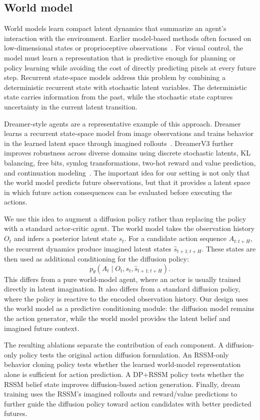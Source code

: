 \subsection{World model}

World models learn compact latent dynamics that summarize an agent's interaction with the environment. Earlier model-based methods often focused on low-dimensional states or proprioceptive observations~\cite{embed,chua}. For visual control, the model must learn a representation that is predictive enough for planning or policy learning while avoiding the cost of directly predicting pixels at every future step. Recurrent state-space models address this problem by combining a deterministic recurrent state with stochastic latent variables. The deterministic state carries information from the past, while the stochastic state captures uncertainty in the current latent transition.

Dreamer-style agents are a representative example of this approach. Dreamer learns a recurrent state-space model from image observations and trains behavior in the learned latent space through imagined rollouts~\cite{dreamer}. DreamerV3 further improves robustness across diverse domains using discrete stochastic latents, KL balancing, free bits, symlog transformations, two-hot reward and value prediction, and continuation modeling~\cite{dreamerv3}. The important idea for our setting is not only that the world model predicts future observations, but that it provides a latent space in which future action consequences can be evaluated before executing the actions.

We use this idea to augment a diffusion policy rather than replacing the policy with a standard actor-critic agent. The world model takes the observation history $O_t$ and infers a posterior latent state $s_t$. For a candidate action sequence $A_{t:t+H}$, the recurrent dynamics produce imagined latent states $\hat{s}_{t+1:t+H}$. These states are then used as additional conditioning for the diffusion policy:
\[
    p_\theta(A_t \mid O_t, s_t, \hat{s}_{t+1:t+H}).
\]
This differs from a pure world-model agent, where an actor is usually trained directly in latent imagination. It also differs from a standard diffusion policy, where the policy is reactive to the encoded observation history. Our design uses the world model as a predictive conditioning module: the diffusion model remains the action generator, while the world model provides the latent belief and imagined future context.

The resulting ablations separate the contribution of each component. A diffusion-only policy tests the original action diffusion formulation. An RSSM-only behavior cloning policy tests whether the learned world-model representation alone is sufficient for action prediction. A DP+RSSM policy tests whether the RSSM belief state improves diffusion-based action generation. Finally, dream training uses the RSSM's imagined rollouts and reward/value predictions to further guide the diffusion policy toward action candidates with better predicted futures.

